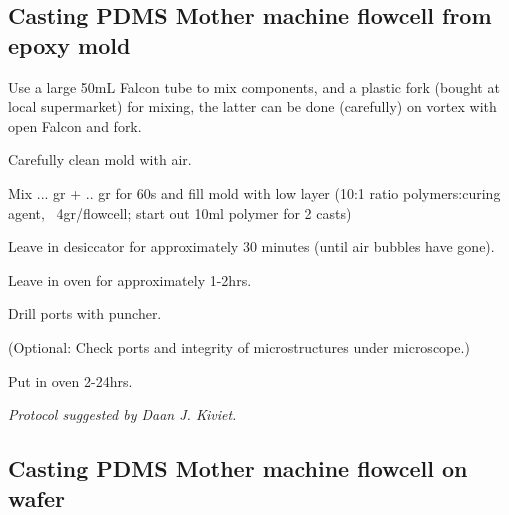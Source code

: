 \subsection*{Casting PDMS Mother machine flowcell from epoxy mold}

Use a large 50mL Falcon tube to mix components, and a plastic fork (bought at local supermarket) for mixing, the latter can be done (carefully) on vortex with open Falcon and fork. 

\begin{compactitem}
    \item Carefully clean mold with air.   
    \item Mix ... gr + .. gr for 60s and fill mold with low layer (10:1 ratio polymers:curing agent, ~4gr/flowcell; start out 10ml polymer for 2 casts)
    \item Leave in desiccator for approximately 30 minutes (until air bubbles have gone).
    \item Leave in oven for approximately 1-2hrs.
    \item Drill ports with puncher.
    \item (Optional: Check ports and integrity of microstructures under microscope.)
    \item Put in oven 2-24hrs.
\end{compactitem}
    
\hfill \textit{Protocol suggested by Daan J. Kiviet.}    
    

\subsection*{Casting PDMS Mother machine flowcell on wafer}


